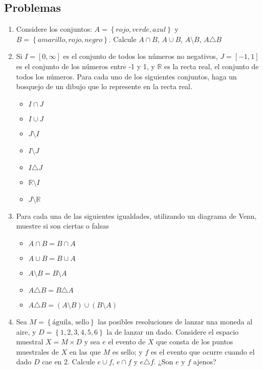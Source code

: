 \documentclass[spanish]{report}
\begin{document}
\subsection{Problemas}

\begin{enumerate}
\item Considere los conjuntos: $A= \left\lbrace rojo, verde, azul \right\rbrace$ y $ B = \left\lbrace amarillo, rojo, negro \right\rbrace$. Calcule $A \cap B$, $A \cup B$, $A \setminus B$, $A \triangle B$

\item Si $I = [0, \infty]$ es el conjunto de todos los números no negativos, $J=[-1, 1]$ es el conjunto de los números entre -1 y 1, y $\mathbb{R}$ es la recta real, el conjunto de todos los números. Para cada uno de los siguientes conjuntos, haga un bosquejo de un dibujo que lo represente en la recta real.
\begin{multicols}{4}\begin{itemize}
	\item $I \cap J$ \item $I \cup J$ \item $J \setminus I$ \item $I \setminus J$ \item $I \triangle J$ \item $\mathbb{R} \setminus I$ \item $J \setminus \mathbb{R}$
\end{itemize}\end{multicols}

\item Para cada una de las siguientes igualdades, utilizando un diagrama de Venn, muestre si son ciertas o falsas
\begin{multicols}{2}\begin{itemize}
	\item $A \cap B = B \cap A$ 
	\item $A \cup B = B \cup A$ 
	\item $A \setminus B = B \setminus A$
	\item $A \triangle B = B \triangle A$
	\item $A \triangle B = (A \setminus B) \cup (B \setminus A)$
\end{itemize}\end{multicols}

\item Sea $M=\left\lbrace \text{águila, sello} \right\rbrace$ las posibles resoluciones de lanzar una moneda al aire, y $D = \left\lbrace 1,2,3,4,5,6 \right\rbrace$ la de lanzar un dado. Considere el espacio muestral $X = M \times D$ y sea $e$ el evento de $X$ que consta de los puntos muestrales de $X$ en las que $M$ es sello; y $f$ es el evento que ocurre cuando el dado $D$ cae en 2.
Calcule $e \cup f$, $e \cap f$ y $e \triangle f$. ¿Son $e$ y $f$ ajenos?
\end{enumerate}
\end{document}
